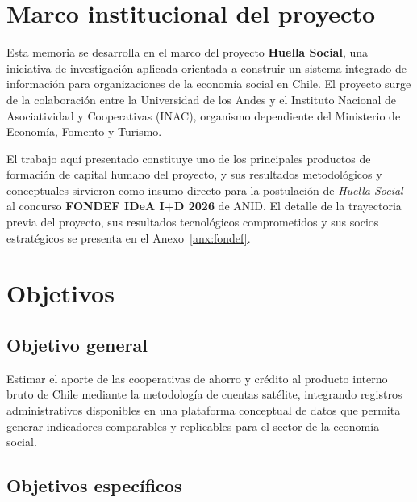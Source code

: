 \newpage

\section{Marco institucional del proyecto}
 
Esta memoria se desarrolla en el marco del proyecto \textbf{Huella Social},
una iniciativa de investigación aplicada orientada a construir un sistema
integrado de información para organizaciones de la economía social en Chile.
El proyecto surge de la colaboración entre la Universidad de los Andes y el
Instituto Nacional de Asociatividad y Cooperativas (INAC), organismo
dependiente del Ministerio de Economía, Fomento y Turismo.
 
El trabajo aquí presentado constituye uno de los principales productos de
formación de capital humano del proyecto, y sus resultados metodológicos
y conceptuales sirvieron como insumo directo para la postulación de
\textit{Huella Social} al concurso \textbf{FONDEF IDeA I+D 2026} de ANID.
El detalle de la trayectoria previa del proyecto, sus resultados
tecnológicos comprometidos y sus socios estratégicos se presenta en el
Anexo~\ref{anx:fondef}.
 


\section{Objetivos}
 
\subsection{Objetivo general}
 
Estimar el aporte de las cooperativas de ahorro y crédito al
producto interno bruto de Chile mediante la metodología de
cuentas satélite, integrando registros administrativos
disponibles en una plataforma conceptual de datos que permita generar indicadores comparables y replicables para el sector de la economía social.
 
\subsection{Objetivos específicos}
 

